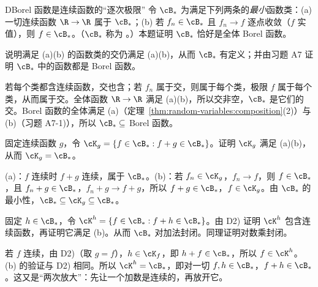 \begin{probleme}{D}{Borel 函数是连续函数的“逐次极限”}
令 $\cB_\ast$ 为满足下列两条的\emph{最小}函数类：(a) 一切连续函数 $\R\to\R$ 属于 $\cB_\ast$；(b) 若 $f_n\in\cB_\ast$ 且 $f_n\to f$ 逐点收敛（$f$ 实值），则 $f\in\cB_\ast$。（$\cB_\ast$ 称为 。）本题证明 $\cB_\ast$ 恰好是全体 Borel 函数。
\begin{questions}
\item 说明满足 (a)(b) 的函数类的交仍满足 (a)(b)，从而 $\cB_\ast$ 有定义；并由习题 A7 证明 $\cB_\ast$ 中的函数都是 Borel 函数。
\begin{solution}
若每个类都含连续函数，交也含；若 $f_n$ 属于交，则属于每个类，极限 $f$ 属于每个类，从而属于交。全体函数 $\R\to\R$ 满足 (a)(b)，所以交非空，$\cB_\ast$ 是它们的交。Borel 函数的全体满足 (a)（定理~\ref{thm:random-variables:composition}(2)）与 (b)（习题 A7-1)），所以 $\cB_\ast\subseteq$ Borel 函数。
\end{solution}
\item 固定连续函数 $g$，令 $\cK_g=\{f\in\cB_\ast: f+g\in\cB_\ast\}$。证明 $\cK_g$ 满足 (a)(b)，从而 $\cK_g=\cB_\ast$。
\begin{solution}
(a)：$f$ 连续时 $f+g$ 连续，属于 $\cB_\ast$。(b)：若 $f_n\in\cK_g$，$f_n\to f$，则 $f\in\cB_\ast$，且 $f_n+g\in\cB_\ast$，$f_n+g\to f+g$，所以 $f+g\in\cB_\ast$，$f\in\cK_g$。由 $\cB_\ast$ 的最小性，$\cB_\ast\subseteq\cK_g\subseteq\cB_\ast$。
\end{solution}
\item 固定 $h\in\cB_\ast$，令 $\cK^h=\{f\in\cB_\ast: f+h\in\cB_\ast\}$。由 D2) 证明 $\cK^h$ 包含连续函数，再证明它满足 (b)。从而 $\cB_\ast$ 对加法封闭。同理证明对数乘封闭。
\begin{solution}
若 $f$ 连续，由 D2)（取 $g=f$），$h\in\cK_f$，即 $h+f\in\cB_\ast$，所以 $f\in\cK^h$。(b) 的验证与 D2) 相同。所以 $\cK^h=\cB_\ast$，即对一切 $f,h\in\cB_\ast$，$f+h\in\cB_\ast$。这又是“两次放大”：先让一个加数是连续的，再放开它。


\end{solution}
\end{questions}
\end{probleme}
